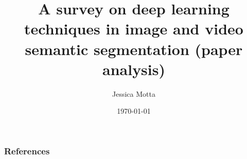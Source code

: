 \documentclass[aspectratio=169]{beamer} %
\title[DP in semantic segmentation]{A survey on deep learning techniques in image and video semantic segmentation (paper analysis)}
\date{\today}
\author[Jessica Motta]{Jessica Motta}
\institute[Senai Cimatec]{Senai Cimatec}
\begin{document}
\begin{frame}
  \titlepage
\end{frame}








    
    \begin{frame}[t, allowframebreaks]
        \frametitle{References}
        
        
    \end{frame}
\end{document}
